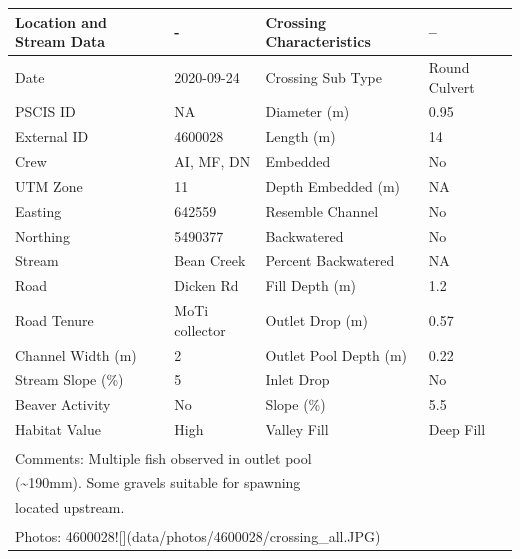 \documentclass[
]{book}
\begin{document}
\begin{tabular}{l|l|l|l}
\hline
Location and Stream Data & - & Crossing Characteristics & --\\
\hline
Date & 2020-09-24 & Crossing Sub Type & Round Culvert\\
\hline
PSCIS ID & NA & Diameter (m) & 0.95\\
\hline
External ID & 4600028 & Length (m) & 14\\
\hline
Crew & AI, MF, DN & Embedded & No\\
\hline
UTM Zone & 11 & Depth Embedded (m) & NA\\
\hline
Easting & 642559 & Resemble Channel & No\\
\hline
Northing & 5490377 & Backwatered & No\\
\hline
Stream & Bean Creek & Percent Backwatered & NA\\
\hline
Road & Dicken Rd & Fill Depth (m) & 1.2\\
\hline
Road Tenure & MoTi collector & Outlet Drop (m) & 0.57\\
\hline
Channel Width (m) & 2 & Outlet Pool Depth (m) & 0.22\\
\hline
Stream Slope (\%) & 5 & Inlet Drop & No\\
\hline
Beaver Activity & No & Slope (\%) & 5.5\\
\hline
Habitat Value & High & Valley Fill & Deep Fill\\
\hline
\multicolumn{4}{l}{\textsuperscript{} Comments: Multiple fish observed in outlet pool}\\
\multicolumn{4}{l}{(\textasciitilde{}190mm).  Some gravels suitable for spawning}\\
\multicolumn{4}{l}{located upstream.}\\
\multicolumn{4}{l}{\textsuperscript{} Photos: 4600028![](data/photos/4600028/crossing\_all.JPG)}\\
\end{tabular}
\end{document}
